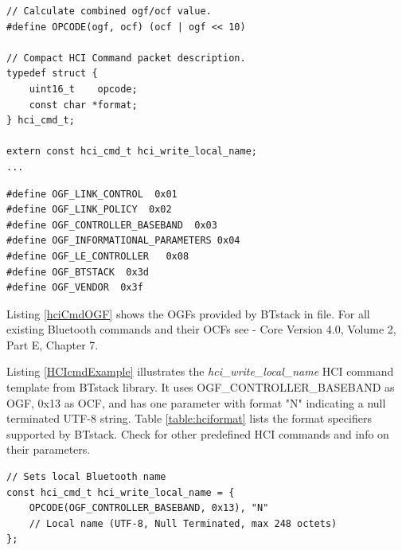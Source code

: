 \documentclass[a4paper,titlepage,oneside,12pt]{amsart} %
\begin{document}
\noindent\begin{minipage}{\textwidth}
\begin{lstlisting}[caption = hci\_cmds.h defines HCI command template., label=HCIcmdTemplate]
// Calculate combined ogf/ocf value.
#define OPCODE(ogf, ocf) (ocf | ogf << 10)

// Compact HCI Command packet description.
typedef struct {
    uint16_t    opcode;
    const char *format;
} hci_cmd_t;

extern const hci_cmd_t hci_write_local_name;
...
\end{lstlisting}
\end{minipage}

\begin{lstlisting}[caption=hci.h defines possible OGFs used for creation of a HCI command., label=hciCmdOGF]
#define OGF_LINK_CONTROL  0x01
#define OGF_LINK_POLICY  0x02
#define OGF_CONTROLLER_BASEBAND  0x03
#define OGF_INFORMATIONAL_PARAMETERS 0x04
#define OGF_LE_CONTROLLER   0x08
#define OGF_BTSTACK  0x3d
#define OGF_VENDOR  0x3f
\end{lstlisting}

Listing \ref{hciCmdOGF} shows the OGFs provided by BTstack in  file.  For all existing Bluetooth commands and their OCFs see \BluetoothSpecificationURL{} - Core Version 4.0, Volume 2, Part E, Chapter 7.

Listing \ref{HCIcmdExample} illustrates the \emph{hci\_write\_local\_name} HCI command template from \mbox{BTstack} library. It uses  OGF\_CONTROLLER\_BASEBAND as OGF, 0x13 as OCF, and has one parameter with format "N" indicating a null terminated UTF-8 string. Table \ref{table:hciformat} lists the format specifiers supported by BTstack. Check  for other predefined HCI commands and info on their parameters.

\begin{lstlisting}[caption= Example of HCI command template., label=HCIcmdExample]
// Sets local Bluetooth name
const hci_cmd_t hci_write_local_name = {
    OPCODE(OGF_CONTROLLER_BASEBAND, 0x13), "N"
    // Local name (UTF-8, Null Terminated, max 248 octets)
};
\end{lstlisting}
\end{document}
